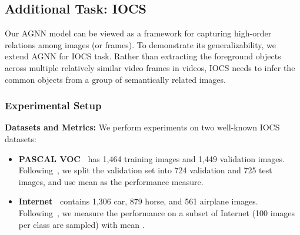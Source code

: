 \documentclass[10pt,twocolumn,letterpaper]{article}
\begin{document}
\subsection{Additional Task: IOCS}\label{sec:exIOCS}
\vspace*{-2pt}
Our AGNN model can be viewed as a framework for capturing high-order relations among images (or frames). To demonstrate its  generalizability, we extend  AGNN for IOCS task. Rather than  extracting the foreground objects across multiple relatively similar video frames in videos, IOCS needs to infer the common objects from a group of semantically related images.
\vspace*{-10pt}
\subsubsection{Experimental Setup}
\vspace*{-4pt}
\noindent\textbf{Datasets and Metrics:} We perform experiments on two well-known IOCS datasets:
\begin{itemize}[leftmargin=*]
	\setlength{\itemsep}{0pt}
	\setlength{\parsep}{-2pt}
	\setlength{\parskip}{-0pt}
	\setlength{\leftmargin}{-15pt}
\vspace{-4pt}
	\item \textbf{PASCAL VOC~\cite{pascal-voc-2012}} has 1,464 training images and 1,449 validation images. Following~\cite{DBLP:journals/corr/abs-1804-06423}, we split the validation set into 724 validation and 725 test images, and use mean  as the performance measure.
	
	\item \textbf{Internet~\cite{Rubinstein_2013_CVPR}}  contains 1,306 car, 879 horse, and 561 airplane images.  Following~\cite{chen2018semantic,quan2016object}, we measure the performance on a subset of Internet (100 images per class are sampled) with mean .
\vspace*{-2pt}
\end{itemize}
\end{document}
